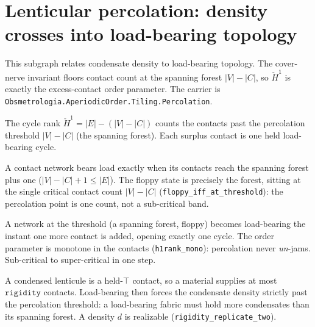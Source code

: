 \section{Lenticular percolation: density crosses into load-bearing topology}

This subgraph relates condensate density to load-bearing topology.  The
cover-nerve invariant floors contact count at the spanning forest
$|V|-|C|$, so $\check H^1$ is exactly the excess-contact order parameter.
The carrier is \texttt{Obsmetrologia.AperiodicOrder.Tiling.Percolation}.

\begin{proposition}\label{thm:percolation-order-parameter}\leanok{}
The cycle rank $\check H^1 = |E| - (|V| - |C|)$ counts the contacts past the percolation threshold
$|V| - |C|$ (the spanning forest). Each surplus contact is one held load-bearing cycle.
\end{proposition}

\begin{theorem}\label{thm:percolation-threshold-law}\leanok{}
A contact network bears load exactly when its contacts reach the spanning forest plus one
($|V| - |C| + 1 \le |E|$). The floppy state is precisely the forest, sitting at the single critical
contact count $|V| - |C|$ (\texttt{floppy\_iff\_at\_threshold}): the percolation point is one count,
not a sub-critical band.
\end{theorem}

\begin{theorem}\label{thm:percolation-onset}\leanok{}
A network at the threshold (a spanning forest, floppy) becomes load-bearing the instant one more
contact is added, opening exactly one cycle. The order parameter is monotone in the contacts
(\texttt{h1rank\_mono}): percolation never \emph{un}-jams. Sub-critical to super-critical in one step.
\end{theorem}

\begin{theorem}\label{thm:percolation-density-necessary}\leanok{}
A condensed lenticule is a held-$\top$ contact, so a material supplies at most $\texttt{rigidity}$
contacts. Load-bearing then forces the condensate density strictly past the percolation threshold: a
load-bearing fabric must hold more condensates than its spanning forest. A density $d$ is realizable
(\texttt{rigidity\_replicate\_two}).
\end{theorem}

